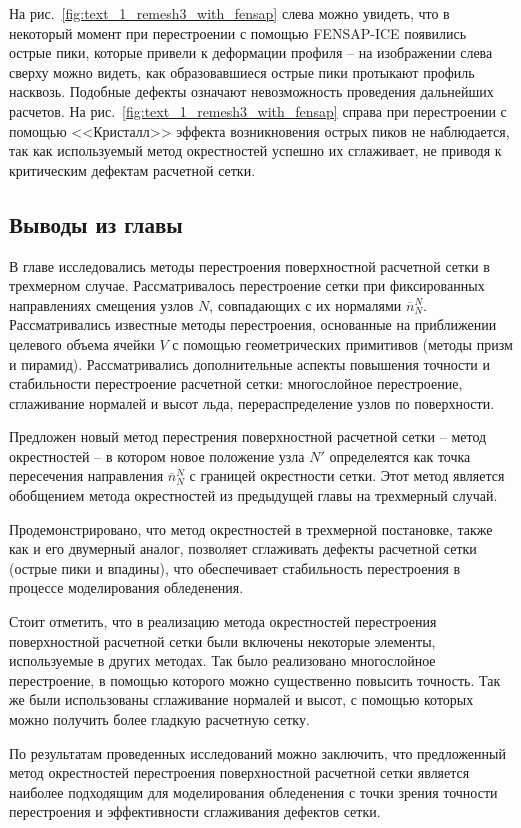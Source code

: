 На рис.~\ref{fig:text_1_remesh3_with_fensap} слева можно увидеть, что в некоторый момент при перестроении с помощью FENSAP-ICE появились острые пики, которые привели к деформации профиля -- на изображении слева сверху можно видеть, как образовавшиеся острые пики протыкают профиль насквозь.
Подобные дефекты означают невозможность проведения дальнейших расчетов.
На рис.~\ref{fig:text_1_remesh3_with_fensap} справа при перестроении с помощью <<Кристалл>> эффекта возникновения острых пиков не наблюдается, так как используемый метод окрестностей успешно их сглаживает, не приводя к критическим дефектам расчетной сетки.


\subsection{Выводы из главы}

В главе исследовались методы перестроения поверхностной расчетной сетки в трехмерном случае.
Рассматривалось перестроение сетки при фиксированных направлениях смещения узлов $N$, совпадающих с их нормалями $\overline{n}_{N}^N$.
Рассматривались известные методы перестроения, основанные на приближении целевого объема ячейки $V$ с помощью геометрических примитивов (методы призм и пирамид).
Рассматривались дополнительные аспекты повышения точности и стабильности перестроение расчетной сетки: многослойное перестроение, сглаживание нормалей и высот льда, перераспределение узлов по поверхности.

Предложен новый метод перестрения поверхностной расчетной сетки -- метод окрестностей -- в котором новое положение узла $N'$ определеятся как точка пересечения направления $\overline{n}_{N}^N$ с границей окрестности сетки.
Этот метод является обобщением метода окрестностей из предыдущей главы на трехмерный случай.

Продемонстрировано, что метод окрестностей в трехмерной постановке, также как и его двумерный аналог, позволяет сглаживать дефекты расчетной сетки (острые пики и впадины), что обеспечивает стабильность перестроения в процессе моделирования обледенения.

Стоит отметить, что в реализацию метода окрестностей перестроения поверхностной расчетной сетки были включены некоторые элементы, используемые в других методах.
Так было реализовано многослойное перестроение, в помощью которого можно существенно повысить точность.
Так же были использованы сглаживание нормалей и высот, с помощью которых можно получить более гладкую расчетную сетку.

По результатам проведенных исследований можно заключить, что предложенный метод окрестностей перестроения поверхностной расчетной сетки является наиболее подходящим для моделирования обледенения с точки зрения точности перестроения и эффективности сглаживания дефектов сетки.

